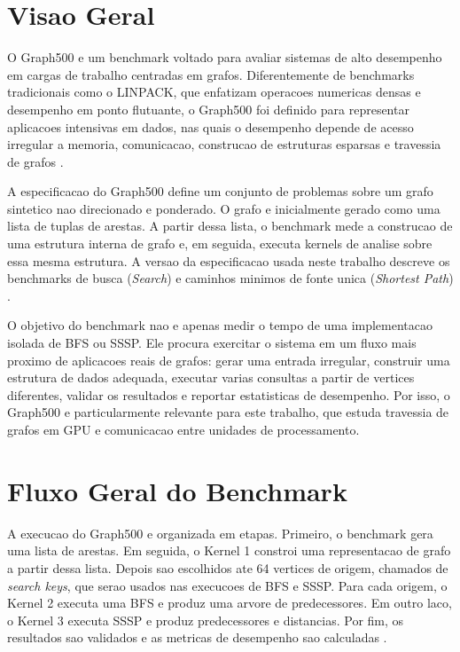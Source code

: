 \section{Visao Geral}

O Graph500 e um benchmark voltado para avaliar sistemas de alto desempenho em
cargas de trabalho centradas em grafos. Diferentemente de benchmarks tradicionais
como o LINPACK, que enfatizam operacoes numericas densas e desempenho em ponto
flutuante, o Graph500 foi definido para representar aplicacoes intensivas em
dados, nas quais o desempenho depende de acesso irregular a memoria,
comunicacao, construcao de estruturas esparsas e travessia de grafos
\cite{murphygraph500, graph500spec}.

A especificacao do Graph500 define um conjunto de problemas sobre um grafo
sintetico nao direcionado e ponderado. O grafo e inicialmente gerado como uma
lista de tuplas de arestas. A partir dessa lista, o benchmark mede a construcao
de uma estrutura interna de grafo e, em seguida, executa kernels de analise sobre
essa mesma estrutura. A versao da especificacao usada neste trabalho descreve os
benchmarks de busca (\textit{Search}) e caminhos minimos de fonte unica
(\textit{Shortest Path}) \cite{graph500spec}.

O objetivo do benchmark nao e apenas medir o tempo de uma implementacao isolada
de BFS ou SSSP. Ele procura exercitar o sistema em um fluxo mais proximo de
aplicacoes reais de grafos: gerar uma entrada irregular, construir uma estrutura
de dados adequada, executar varias consultas a partir de vertices diferentes,
validar os resultados e reportar estatisticas de desempenho. Por isso, o
Graph500 e particularmente relevante para este trabalho, que estuda travessia de
grafos em GPU e comunicacao entre unidades de processamento.

\section{Fluxo Geral do Benchmark}

A execucao do Graph500 e organizada em etapas. Primeiro, o benchmark gera uma
lista de arestas. Em seguida, o Kernel 1 constroi uma representacao de grafo a
partir dessa lista. Depois sao escolhidos ate 64 vertices de origem, chamados de
\textit{search keys}, que serao usados nas execucoes de BFS e SSSP. Para cada
origem, o Kernel 2 executa uma BFS e produz uma arvore de predecessores. Em outro
laco, o Kernel 3 executa SSSP e produz predecessores e distancias. Por fim, os
resultados sao validados e as metricas de desempenho sao calculadas
\cite{graph500spec}.

